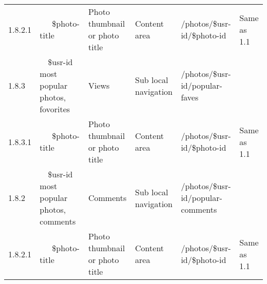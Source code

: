 \documentclass[12pt,a4paper]{article}
\begin{document}
\begin{landscape}
\begin{table}[h!b!p!]
\begin{center}
\begin{tiny}
\begin{tabular}{l|l|l|l|l|p{3cm}}
                  1.8.2.1 &
                  ~~~\$photo-title &
                  Photo thumbnail or photo title &
                  Content area &
                  /photos/\$usr-id/\$photo-id &
                  Same as 1.1 \\

                1.8.3 &
                ~~\$usr-id most popular photos, fovorites &
                Views &
                Sub local navigation &
                /photos/\$usr-id/popular-faves &
                \\

                  1.8.3.1 &
                  ~~~\$photo-title &
                  Photo thumbnail or photo title &
                  Content area &
                  /photos/\$usr-id/\$photo-id &
                  Same as 1.1 \\

                1.8.2 &
                ~~\$usr-id most popular photos, comments &
                Comments &
                Sub local navigation &
                /photos/\$usr-id/popular-comments &
                \\

                  1.8.2.1 &
                  ~~~\$photo-title &
                  Photo thumbnail or photo title &
                  Content area &
                  /photos/\$usr-id/\$photo-id &
                  Same as 1.1 \\

          \end{tabular}
        \rm
      \end{tiny}
    \end{center}
  \end{table}
\end{landscape}
\end{document}
